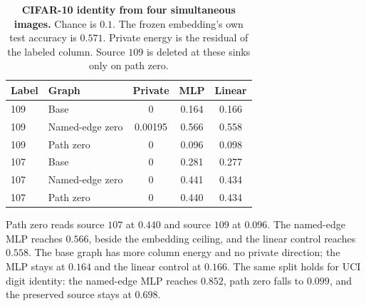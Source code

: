 \begin{table}[t]
\centering
\caption{\textbf{CIFAR-10 identity from four simultaneous images.} Chance is
$0.1$. The frozen embedding's own test accuracy is $0.571$. Private energy is
the residual of the labeled column. Source $109$ is deleted at these sinks
only on path zero.}
\label{tab:population}
\small
\setlength{\tabcolsep}{4pt}
\begin{tabular}{@{}llccc@{}}
\toprule
Label & Graph & Private & MLP & Linear \\
\midrule
109 & Base & 0 & 0.164 & 0.166 \\
109 & Named-edge zero & 0.00195 & 0.566 & 0.558 \\
109 & Path zero & 0 & 0.096 & 0.098 \\
107 & Base & 0 & 0.281 & 0.277 \\
107 & Named-edge zero & 0 & 0.441 & 0.434 \\
107 & Path zero & 0 & 0.440 & 0.434 \\
\bottomrule
\end{tabular}
\end{table}

Path zero reads source $107$ at $0.440$ and source $109$ at $0.096$. The
named-edge MLP reaches $0.566$, beside the embedding ceiling, and the linear
control reaches $0.558$. The base graph has more column energy and no private
direction; the MLP stays at $0.164$ and the linear control at $0.166$. The same split holds for UCI digit
identity: the named-edge MLP reaches $0.852$, path zero falls to $0.099$, and
the preserved source stays at $0.698$.
